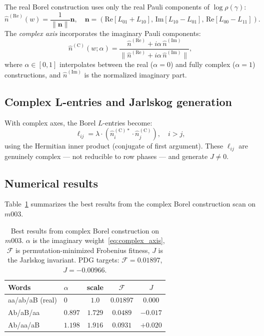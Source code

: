 \documentclass[floatfix,aps,prd,twocolumn,showpacs,superscriptaddress,longbibliography]{revtex4-2}
\begin{document}
The real Borel construction uses only the real Pauli components
of $\log\rho(\gamma)$:
\begin{equation}
\hat{n}^{(\mathrm{Re})}(w) = \frac{1}{\|\mathbf{n}\|}\mathbf{n},
\quad \mathbf{n} = (\mathrm{Re}[L_{01}+L_{10}],\,
\mathrm{Im}[L_{10}-L_{01}],\, \mathrm{Re}[L_{00}-L_{11}]).
\end{equation}
The \emph{complex axis} incorporates the imaginary Pauli components:
\begin{equation}
\hat{n}^{(\mathrm{C})}(w;\alpha) =
\frac{\hat{n}^{(\mathrm{Re})} + i\alpha\,\hat{n}^{(\mathrm{Im})}}
{\|\hat{n}^{(\mathrm{Re})} + i\alpha\,\hat{n}^{(\mathrm{Im})}\|},
\label{eq:complex_axis}
\end{equation}
where $\alpha \in [0,1]$ interpolates between the real ($\alpha=0$)
and fully complex ($\alpha=1$) constructions, and
$\hat{n}^{(\mathrm{Im})}$ is the normalized imaginary part.

\subsection{Complex L-entries and Jarlskog generation}

With complex axes, the Borel $L$-entries become:
\begin{equation}
\ell_{ij} = \lambda \cdot (\hat{n}^{(\mathrm{C})*}_i \cdot
\hat{n}^{(\mathrm{C})}_j), \quad i > j,
\end{equation}
using the Hermitian inner product (conjugate of first argument).
These $\ell_{ij}$ are genuinely complex — not reducible to
row phases — and generate $J \neq 0$.

\subsection{Numerical results}

Table~\ref{tab:complex_results} summarizes the best results
from the complex Borel construction scan on $m003$.

\begin{table}[h]
\centering
\caption{Best results from complex Borel construction on $m003$.
$\alpha$ is the imaginary weight~\eqref{eq:complex_axis},
$\mathcal{F}$ is permutation-minimized Frobenius fitness,
$J$ is the Jarlskog invariant.
PDG targets: $\mathcal{F} = 0.01897$, $J = -0.00966$.}
\label{tab:complex_results}
\begin{tabular}{llccc}
\toprule
Words & $\alpha$ & scale & $\mathcal{F}$ & $J$ \\
\midrule
aa/ab/aB (real) & $0$ & $1.0$ & $0.01897$ & $0.000$ \\
Ab/aB/aa        & $0.897$ & $1.729$ & $0.0489$ & $-0.017$ \\
Ab/aa/aB        & $1.198$ & $1.916$ & $0.0931$ & $+0.020$ \\
\bottomrule
\end{tabular}
\end{table}
\end{document}
